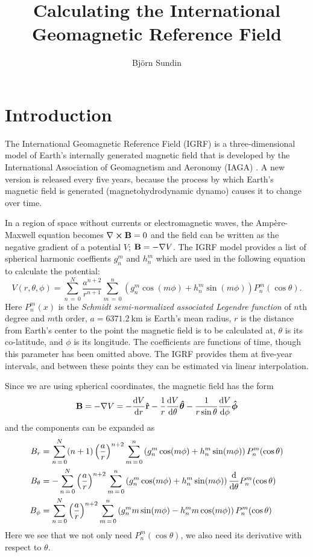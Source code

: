 \documentclass[12pt]{article}
\title{\vspace{-2.5em}Calculating the International Geomagnetic Reference Field}
\author{Björn Sundin}
\begin{document}
\maketitle
\section{Introduction}
The International Geomagnetic Reference Field (IGRF) is a three-dimensional model of Earth's internally generated magnetic field that is developed by the International Association of Geomagnetism and Aeronomy (IAGA) \parencite{Alken2021}. A new version is released every five years, because the process by which Earth's magnetic field is generated (magnetohydrodynamic dynamo) causes it to change over time.

In a region of space without currents or electromagnetic waves, the Ampère-Maxwell equation becomes $\nabla\crossproduct\vect{B} = 0$ and the field can be written as the negative gradient of a potential $V$; $\boldsymbol{\mathbf{B}} = -\nabla V$. The IGRF model provides a list of spherical harmonic coeffients $g_n^m$ and $h_n^m$ which are used in the following equation to calculate the potential:
\begin{equation}
  V(r, \theta, \phi) = \sum_{n\,=\,0}^N\frac{a^{n+2}}{r^{n+1}}\sum_{m\,=\,0}^n\left(g_n^m\cos(m\phi) + h_n^m\sin(m\phi)\right)P_n^m(\cos\theta).
\end{equation}
Here $P_n^m(x)$ is the \textit{Schmidt semi-normalized associated Legendre function} of $n$th degree and $m$th order, $a = \SI{6371.2}{\km}$ is Earth's mean radius, $r$ is the distance from Earth's center to the point the magnetic field is to be calculated at, $\theta$ is its co-latitude, and $\phi$ is its longitude. The coefficients are functions of time, though this parameter has been omitted above. The IGRF provides them at five-year intervals, and between these points they can be estimated via linear interpolation. 

Since we are using spherical coordinates, the magnetic field has the form 
\begin{equation}
  \vect{B} = -\nabla V = -\derivative{V}{r}\uvect{r} -\frac{1}{r}\derivative{V}{\theta}\uvect{\theta} - \frac{1}{r\sin\theta}\derivative{V}{\phi}\uvect{\phi}
\end{equation}
and the components can be expanded as
\begin{align}
  B_r &= \sum_{n\,=\,0}^N(n+1)\left(\frac{a}{r}\right)^{n+2}\sum_{m\,=\,0}^n\left(g_n^m\cos(m\phi) + h_n^m\sin(m\phi)\right)P_n^m(\cos\theta)\\ 
  B_\theta &= -\sum_{n\,=\,0}^N\left(\frac{a}{r}\right)^{n+2}\sum_{m\,=\,0}^n\left(g_n^m\cos(m\phi) + h_n^m\sin(m\phi)\right)\derivative{\theta}P_n^m(\cos\theta)\\ 
  B_\phi &= \sum_{n\,=\,0}^N\left(\frac{a}{r}\right)^{n+2}\sum_{m\,=\,0}^n\left(g_n^mm\sin(m\phi) - h_n^mm\cos(m\phi)\right)P_n^m(\cos\theta)
\end{align}
Here we see that we not only need $P_n^m(\cos\theta)$, we also need its derivative with respect to $\theta$.
\end{document}
